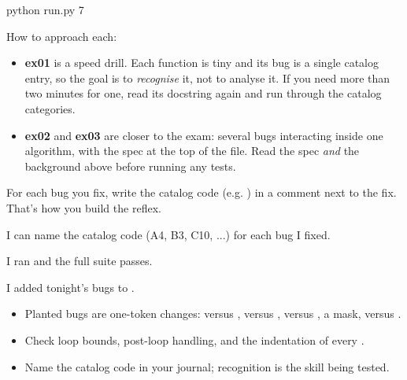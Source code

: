 \documentclass[10pt,a4paper]{article}
\begin{document}
\begin{shcode}
python run.py 7
\end{shcode}
How to approach each:
\begin{itemize}
\item \textbf{ex01} is a speed drill. Each function is tiny and its bug is a single catalog entry, so the goal is to \emph{recognise} it, not to analyse it. If you need more than two minutes for one, read its docstring again and run through the catalog categories.
\item \textbf{ex02} and \textbf{ex03} are closer to the exam: several bugs interacting inside one algorithm, with the spec at the top of the file. Read the spec \emph{and} the background above before running any tests.
\end{itemize}
For each bug you fix, write the catalog code (e.g. ) in a comment next to the fix. That’s how you build the reflex.
\begin{checklistbox}
\begin{checklist}
\item I can name the catalog code (A4, B3, C10, ...) for each bug I fixed.
\item I ran  and the full suite passes.
\item I added tonight’s bugs to .
\end{checklist}
\scoreline
\end{checklistbox}
\begin{examlensbox}
\begin{itemize}
\item Planted bugs are one-token changes: \code{\textless{}\allowbreak{}} versus \code{\textless{}\allowbreak{}=\allowbreak{}},  versus , \code{+} versus \code{-}, a mask,  versus \code{=\allowbreak{}=\allowbreak{}}.
\item Check loop bounds, post-loop handling, and the indentation of every .
\item Name the catalog code in your journal; recognition is the skill being tested.
\end{itemize}
\end{examlensbox}
\bugjournalifspace
\end{document}
